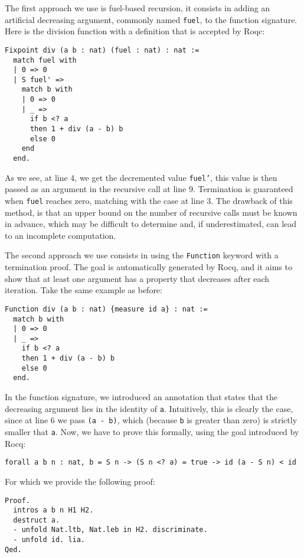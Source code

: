 The first approach we use is fuel-based recursion, it consists in adding an artificial decreasing argument, commonly named \texttt{fuel}, to the function signature.
Here is the division function with a definition that is accepted by Roqc:

\begin{lstlisting}[style=Rocq]
Fixpoint div (a b : nat) (fuel : nat) : nat :=
  match fuel with
  | 0 => 0
  | S fuel' =>
    match b with
    | 0 => 0
    | _ =>
      if b <? a
      then 1 + div (a - b) b
      else 0
    end
  end.
\end{lstlisting}

As we see, at line 4, we get the decremented value \texttt{fuel'}, this value is then passed as an argument in the recursive call at line 9.
Termination is guaranteed when \texttt{fuel} reaches zero, matching with the case at line 3.
The drawback of this method, is that an upper bound on the number of recursive calls must be known in advance, which may be difficult to determine and, if underestimated, can lead to an incomplete computation.

The second approach we use consists in using the \texttt{Function} keyword with a termination proof. The goal is automatically generated by Rocq, and it aims to show that at least one argument has a property that decreases after each iteration.
Take the same example as before:

\begin{lstlisting}[style=Rocq]
Function div (a b : nat) {measure id a} : nat :=
  match b with
  | 0 => 0
  | _ =>
    if b <? a
    then 1 + div (a - b) b
    else 0
  end.
\end{lstlisting}

In the function signature, we introduced an annotation that states that the decreasing argument lies in the identity of \texttt a.
Intuitively, this is clearly the case, since at line 6 we pass \texttt{(a - b)}, which (because \texttt b is greater than zero) is strictly smaller that \texttt a.
Now, we have to prove this formally, using the goal introduced by Rocq:

\begin{lstlisting}[style=Rocq]
forall a b n : nat, b = S n -> (S n <? a) = true -> id (a - S n) < id
\end{lstlisting}

For which we provide the following proof:

\begin{lstlisting}[style=Rocq]
Proof.
  intros a b n H1 H2.
  destruct a.
  - unfold Nat.ltb, Nat.leb in H2. discriminate.
  - unfold id. lia.
Qed.
\end{lstlisting}

